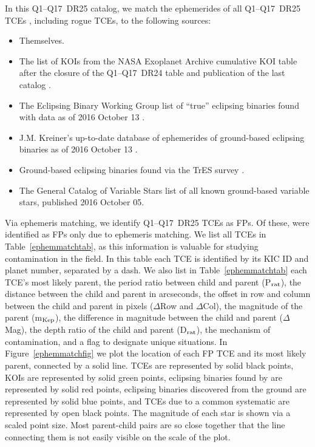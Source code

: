In this Q1--Q17~DR25 catalog, we match the ephemerides of all Q1--Q17~DR25 TCEs \citep{Twicken2016}, including rogue TCEs, to the following sources:

\begin{itemize}
 \item Themselves.
 \item The list of \npredrtwentyfivekois{} KOIs from the NASA Exoplanet Archive cumulative KOI table after the closure of the Q1--Q17~DR24 table and publication of the last catalog \citep{Coughlin2016}.
 \item The \kepler{} Eclipsing Binary Working Group list of \nkebs{} ``true'' eclipsing binaries found with \kepler{} data as of 2016 October 13 \citep{Prsa2011,Slawson2011,Kirk2016}.
 \item J.M. Kreiner's up-to-date database of ephemerides of ground-based eclipsing binaries as of 2016 October 13 \citep{Kreiner2004}.
 \item Ground-based eclipsing binaries found via the TrES survey \citep{Devor2008a}.
 \item The General Catalog of Variable Stars \citep[GCVS][]{Samus2015} list of all known ground-based variable stars, published 2016 October 05.
\end{itemize}






Via ephemeris matching, we identify \nephemmatch{} Q1--Q17~DR25 TCEs as FPs. Of these, \nonlyephemmatch{} were identified as FPs only due to ephemeris matching. We list all \nephemmatch{} TCEs in Table~\ref{ephemmatchtab}, as this information is valuable for studying contamination in the \kepler{} field. In this table each TCE is identified by its KIC ID and planet number, separated by a dash. We also list in Table~\ref{ephemmatchtab} each TCE's most likely parent, the period ratio between child and parent (P$_{\rm rat}$), the distance between the child and parent in arcseconds, the offset in row and column between the child and parent in pixels ($\Delta$Row and $\Delta$Col), the magnitude of the parent (m$_{\rm Kep}$), the difference in magnitude between the child and parent ($\Delta$Mag), the depth ratio of the child and parent (D$_{\rm rat}$), the mechanism of contamination, and a flag to designate unique situations. In Figure~\ref{ephemmatchfig} we plot the location of each FP TCE and its most likely parent, connected by a solid line. TCEs are represented by solid black points, KOIs are represented by solid green points, eclipsing binaries found by \kepler{} are represented by solid red points, eclipsing binaries discovered from the ground are represented by solid blue points, and TCEs due to a common systematic are represented by open black points. The \kepler{} magnitude of each star is shown via a scaled point size. Most parent-child pairs are so close together that the line connecting them is not easily visible on the scale of the plot. 


